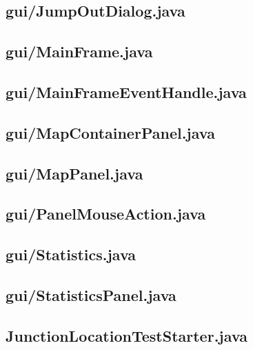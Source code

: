 \subsection{gui/JumpOutDialog.java}

\newpage
\subsection{gui/MainFrame.java}

\newpage
\subsection{gui/MainFrameEventHandle.java}

\newpage
\subsection{gui/MapContainerPanel.java}

\newpage
\subsection{gui/MapPanel.java}

\newpage
\subsection{gui/PanelMouseAction.java}

\newpage
\subsection{gui/Statistics.java}

\newpage
\subsection{gui/StatisticsPanel.java}

\newpage
\subsection{JunctionLocationTestStarter.java}

\newpage

